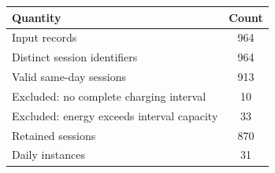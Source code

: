 \begin{tabular}{lc}
\toprule
Quantity & Count \\
\midrule
Input records & 964 \\
Distinct session identifiers & 964 \\
Valid same-day sessions & 913 \\
Excluded: no complete charging interval & 10 \\
Excluded: energy exceeds interval capacity & 33 \\
Retained sessions & 870 \\
Daily instances & 31 \\
\bottomrule
\end{tabular}
